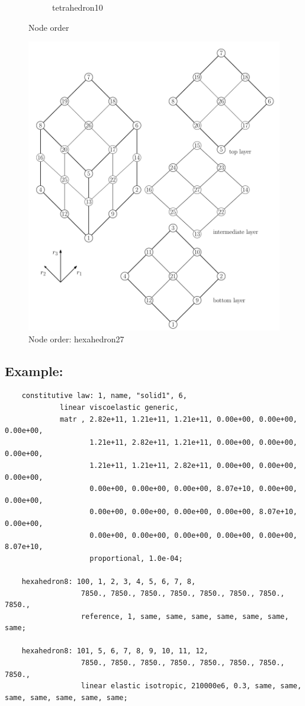 \begin{figure}[htb]
\begin{subfigure}{0.5\textwidth}
    \caption{tetrahedron10}
    \label{fig:EL:SOLID:TETRAHEDRON10H}
  \end{subfigure}
  \caption{Node order}
  \label{fig:EL:SOLID:NODE_ORDER}
\end{figure}

\begin{figure}[htb]
\centering
\includegraphics[width=.5\textwidth]{hexahedron27}
\caption{Node order: hexahedron27}
\label{fig:EL:SOLID:HEXAHEDRON27}
\end{figure}

\subsection{Example:}
\begin{verbatim}
    constitutive law: 1, name, "solid1", 6,
             linear viscoelastic generic,
             matr , 2.82e+11, 1.21e+11, 1.21e+11, 0.00e+00, 0.00e+00, 0.00e+00,
                    1.21e+11, 2.82e+11, 1.21e+11, 0.00e+00, 0.00e+00, 0.00e+00,
                    1.21e+11, 1.21e+11, 2.82e+11, 0.00e+00, 0.00e+00, 0.00e+00,
                    0.00e+00, 0.00e+00, 0.00e+00, 8.07e+10, 0.00e+00, 0.00e+00,
                    0.00e+00, 0.00e+00, 0.00e+00, 0.00e+00, 8.07e+10, 0.00e+00,
                    0.00e+00, 0.00e+00, 0.00e+00, 0.00e+00, 0.00e+00, 8.07e+10,
                    proportional, 1.0e-04;

    hexahedron8: 100, 1, 2, 3, 4, 5, 6, 7, 8,
                  7850., 7850., 7850., 7850., 7850., 7850., 7850., 7850.,
                  reference, 1, same, same, same, same, same, same, same;

    hexahedron8: 101, 5, 6, 7, 8, 9, 10, 11, 12,
                  7850., 7850., 7850., 7850., 7850., 7850., 7850., 7850.,
                  linear elastic isotropic, 210000e6, 0.3, same, same, same, same, same, same, same;
\end{verbatim}

